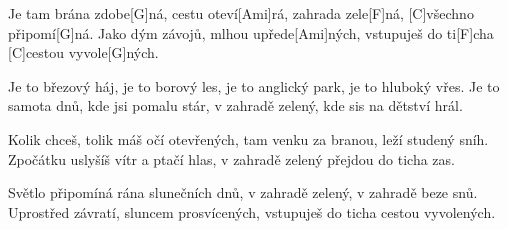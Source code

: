 
\sloka
Je tam brána zdobe[G]ná, cestu oteví[Ami]rá,
zahrada zele[F]ná, [C]všechno připomí[G]ná.
Jako dým závojů, mlhou upřede[Ami]ných,
vstupuješ do ti[F]cha [C]cestou vyvole[G]ných.

\sloka
Je to březový háj, je to borový les,
je to anglický park, je to hluboký vřes.
Je to samota dnů, kde jsi pomalu stár,
v zahradě zelený, kde sis na dětství hrál.

\sloka
Kolik chceš, tolik máš očí otevřených,
tam venku za branou, leží studený sníh.
Zpočátku uslyšíš vítr a ptačí hlas,
v zahradě zelený přejdou do ticha zas.

\sloka
Světlo připomíná rána slunečních dnů,
v zahradě zelený, v zahradě beze snů.
Uprostřed závratí, sluncem prosvícených,
vstupuješ do ticha cestou vyvolených.

